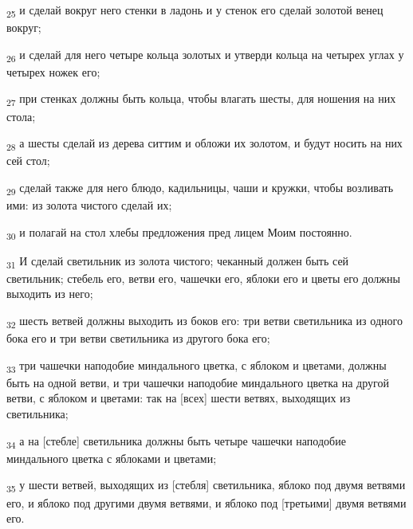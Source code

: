 \begin{tcolorbox}
\textsubscript{25} и сделай вокруг него стенки в ладонь и у стенок его сделай золотой венец вокруг;
\end{tcolorbox}
\begin{tcolorbox}
\textsubscript{26} и сделай для него четыре кольца золотых и утверди кольца на четырех углах у четырех ножек его;
\end{tcolorbox}
\begin{tcolorbox}
\textsubscript{27} при стенках должны быть кольца, чтобы влагать шесты, для ношения на них стола;
\end{tcolorbox}
\begin{tcolorbox}
\textsubscript{28} а шесты сделай из дерева ситтим и обложи их золотом, и будут носить на них сей стол;
\end{tcolorbox}
\begin{tcolorbox}
\textsubscript{29} сделай также для него блюдо, кадильницы, чаши и кружки, чтобы возливать ими: из золота чистого сделай их;
\end{tcolorbox}
\begin{tcolorbox}
\textsubscript{30} и полагай на стол хлебы предложения пред лицем Моим постоянно.
\end{tcolorbox}
\begin{tcolorbox}
\textsubscript{31} И сделай светильник из золота чистого; чеканный должен быть сей светильник; стебель его, ветви его, чашечки его, яблоки его и цветы его должны выходить из него;
\end{tcolorbox}
\begin{tcolorbox}
\textsubscript{32} шесть ветвей должны выходить из боков его: три ветви светильника из одного бока его и три ветви светильника из другого бока его;
\end{tcolorbox}
\begin{tcolorbox}
\textsubscript{33} три чашечки наподобие миндального цветка, с яблоком и цветами, должны быть на одной ветви, и три чашечки наподобие миндального цветка на другой ветви, с яблоком и цветами: так на [всех] шести ветвях, выходящих из светильника;
\end{tcolorbox}
\begin{tcolorbox}
\textsubscript{34} а на [стебле] светильника должны быть четыре чашечки наподобие миндального цветка с яблоками и цветами;
\end{tcolorbox}
\begin{tcolorbox}
\textsubscript{35} у шести ветвей, выходящих из [стебля] светильника, яблоко под двумя ветвями его, и яблоко под другими двумя ветвями, и яблоко под [третьими] двумя ветвями его.
\end{tcolorbox}
